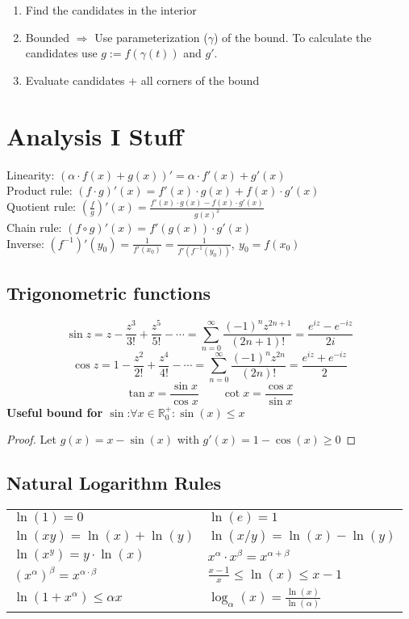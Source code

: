 \documentclass[a4paper, 10pt]{article}
\theoremstyle{definition}
\newcommand{\R}{\mathbb{R}}
\begin{document}
\begin{note*}
    \begin{enumerate}
        \item Find the candidates in the interior
        \item Bounded \(\Rightarrow\) Use parameterization (\(\gamma\)) of the bound. To calculate the candidates use \(g := f(\gamma(t))\) and \(g'\).
        \item Evaluate candidates + all corners of the bound
    \end{enumerate}
\end{note*}

\pagebreak
\section*{Analysis I Stuff}
\begin{ntheorem*}
    Linearity: \((\alpha \cdot f(x) + g(x))' = \alpha \cdot f'(x) + g'(x)\) \\
    Product rule: \((f \cdot g)'(x) = f'(x)\cdot g(x) + f(x)\cdot g'(x)\) \\
    Quotient rule: \(\left(\frac{f}{g}\right)'(x) = \frac{f'(x)\cdot g(x) - f(x)\cdot g'(x)}{g(x)^2}\) \\
    Chain rule: \((f \circ g)'(x) = f'(g(x))\cdot g'(x)\) \\
    Inverse: \((f^{-1})'(y_0) = \frac{1}{f'(x_0)} = \frac{1}{f'(f^{-1}(y_0))}, \ y_0 = f(x_0)\)
\end{ntheorem*}

\subsection*{Trigonometric functions}
\[\sin z = z - \frac{z^3}{3!} + \frac{z^5}{5!} - \cdots = \sum_{n = 0}^\infty \frac{(-1)^n z^{2n + 1}}{(2n + 1)!} = \frac{e^{iz}-e^{-iz}}{2i}\]
\[\cos z = 1 - \frac{z^2}{2!} + \frac{z^4}{4!} - \cdots = \sum_{n = 0}^\infty \frac{(-1)^n z^{2n}}{(2n)!} = \frac{e^{iz}+e^{-iz}}{2}\]
\[\tan x = \frac{\sin x}{\cos x} \qquad \cot x = \frac{\cos x}{\sin x}\]
\textbf{Useful bound for \(\sin\)}:\(\forall x \in \R^+_0: \sin(x) \leq x\)
\begin{proof}
    Let \(g(x) = x - \sin(x)\) with \(g'(x) = 1 - \cos(x) \geq 0\)
\end{proof}

\subsection*{Natural Logarithm Rules}
\begin{tabularx}{\linewidth}{XX}
    $\ln(1) = 0$ & $\ln(e) = 1$ \\
    $\ln(xy) = \ln(x) + \ln(y)$ & $\ln(x/y) = \ln(x) - \ln(y)$ \\
    $\ln(x^y) = y \cdot \ln(x)$ & $x^\alpha \cdot x^\beta = x^{\alpha + \beta}$ \\
    $(x^\alpha)^\beta = x^{\alpha \cdot \beta}$ & $\frac{x - 1}{x} \leq \ln(x) \leq x - 1$ \\
    $\ln(1 + x^\alpha) \leq \alpha x$ & $\log_\alpha(x) = \frac{\ln(x)}{\ln(\alpha)}$
\end{tabularx}
\end{document}

